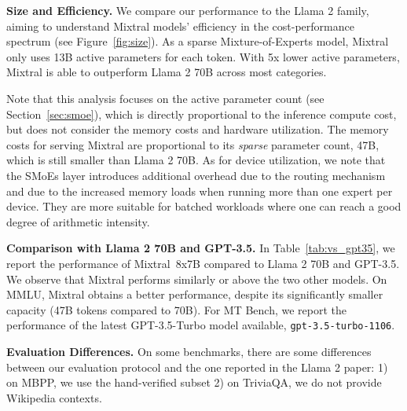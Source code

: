 \documentclass{article}
\def\llama{Llama\xspace}
\def\mixtral{Mixtral\xspace}
\def\mixtralEXSB{Mixtral~8x7B\xspace}
\begin{document}
 \textbf{Size and Efficiency.} We compare our performance to the \llama 2 family, aiming to understand \mixtral models' efficiency in the cost-performance spectrum (see Figure~\ref{fig:size}). As a sparse Mixture-of-Experts model, \mixtral only uses 13B active parameters for each token. With 5x lower active parameters, \mixtral is able to outperform \llama 2 70B across most categories.

Note that this analysis focuses on the active parameter count (see Section~\ref{sec:smoe}), which is directly proportional to the inference compute cost, but does not consider the memory costs and hardware utilization. 
The memory costs for serving \mixtral are proportional to its \emph{sparse} parameter count, 47B, which is still smaller than \llama 2 70B. As for device utilization, we note that the SMoEs layer introduces additional overhead due to the routing mechanism and due to the increased memory loads when running more than one expert per device. They are more suitable for batched workloads where one can reach a good degree of arithmetic intensity.

\textbf{Comparison with \llama 2 70B and GPT-3.5.} In Table~\ref{tab:vs_gpt35}, we report the performance of \mixtralEXSB compared to \llama 2 70B and GPT-3.5. We observe that \mixtral performs similarly or above the two other models.
On MMLU, \mixtral obtains a better performance, despite its significantly smaller capacity (47B tokens compared to 70B).
For MT Bench, we report the performance of the latest GPT-3.5-Turbo model available, \texttt{gpt-3.5-turbo-1106}.

\textbf{Evaluation Differences.} On some benchmarks, there are some differences between our evaluation protocol and the one reported in the \llama 2 paper: 1) on MBPP, we use the hand-verified subset 2) on TriviaQA, we do not provide Wikipedia contexts.
\end{document}
